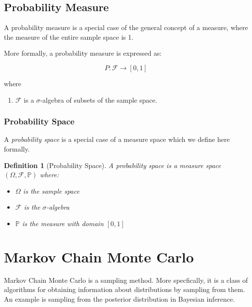\documentclass{article}
\newtheorem{definition}{Definition}
\begin{document}
\subsection{Probability Measure}
A probability measure is a special case of the general concept of a measure, where the measure of the entire sample space is 1.

More formally, a probability measure is expressed as:

$$
P: \mathcal{F} \rightarrow [0,1]
$$

where 

\begin{enumerate}
    \item $\mathcal{F}$ is a $\sigma$-algebra of subsets of the sample space.
\end{enumerate}

\subsubsection{Probability Space}
A \emph{probability space} is a special case of a measure space which we define here formally.

\begin{mdframed}
\begin{definition}[Probability Space]
A \emph{probability space} is a measure space $(\Omega, \mathcal{F}, \mathbb{P} )$ where:

\begin{itemize}
    \item $\Omega$ is the sample space
    \item $\mathcal{F}$ is the $\sigma$-algebra
    \item $\mathbb{P}$ is the measure with domain $[0,1]$
\end{itemize}
\end{definition}
\end{mdframed}

\newpage
\section{Markov Chain Monte Carlo}
Markov Chain Monte Carlo is a sampling method. More specfically, it is a class of algorithms for obtaining information about distributions by sampling from them. An example is sampling from the posterior distribution in Bayesian inference.
\end{document}
